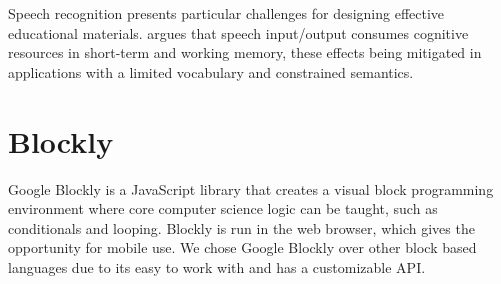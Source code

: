 \documentclass[]{article}
\begin{document}
Speech recognition presents particular challenges for designing effective
educational materials. \cite{Shneiderman:2000:LSR:348941.348990} argues that
speech input/output consumes cognitive resources in short-term and working
memory, these effects being mitigated in applications with a limited vocabulary
and constrained semantics.

\section{Blockly}
Google Blockly is a JavaScript library that creates a visual block programming 
environment where core computer science logic can be taught, such as conditionals and 
looping. Blockly is run in the web browser, which gives the opportunity for mobile use. 
We chose Google Blockly over other block based languages due to its easy to work with and 
has a customizable API.
\end{document}
